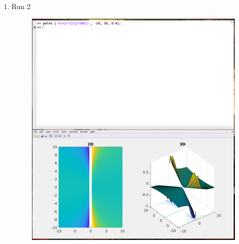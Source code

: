\documentclass[12pt,a4paper]{article}
\begin{document}
\begin{enumerate}[leftmargin=!,labelindent=5pt]
	\item Run 2
		\begin{figure}[H]
			\centering
			\includegraphics[scale=0.7]{./img/paint_02.png}
		\end{figure}
\end{enumerate}
\newpage
\end{document}
